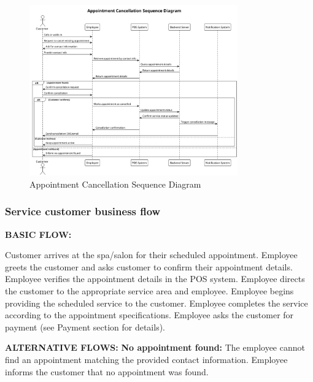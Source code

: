 \documentclass[]{VUMIFTemplateClass}
\begin{document}
\begin{figure}[H]
    \centering
    \includegraphics[width=0.8\textwidth]{images/diagrams/services/appointment_cancellation_sequence.png}
    \caption{Appointment Cancellation Sequence Diagram}
    \label{fig:appointment_cancellation_sequence}
\end{figure}

\subsubsection{Service customer business flow}

\textbf{BASIC FLOW:}

Customer arrives at the spa/salon for their scheduled appointment.
Employee greets the customer and asks customer to confirm their appointment details.
Employee verifies the appointment details in the POS system.
Employee directs the customer to the appropriate service area and employee.
Employee begins providing the scheduled service to the customer.
Employee completes the service according to the appointment specifications.
Employee asks the customer for payment (see Payment section for details).


\textbf{ALTERNATIVE FLOWS:}
\textbf{No appointment found: } The employee cannot find an appointment matching the provided contact information.
Employee informs the customer that no appointment was found.
\end{document}
